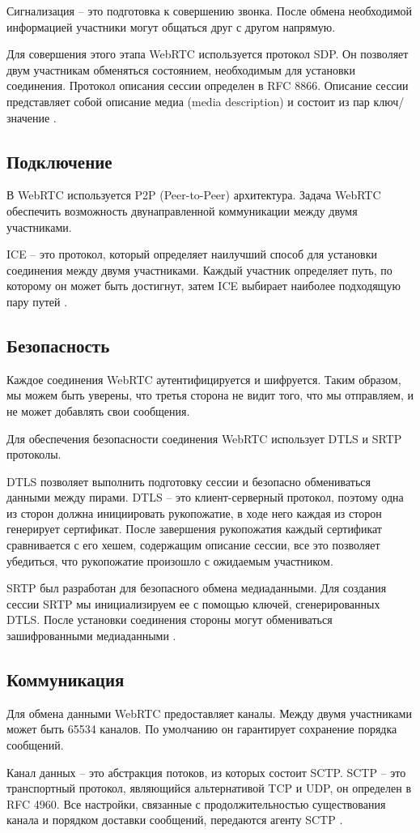 Сигнализация -- это подготовка к совершению звонка. После обмена необходимой информацией участники могут общаться друг с другом напрямую.

Для совершения этого этапа WebRTC используется протокол SDP. Он позволяет двум участникам обменяться состоянием, необходимым для установки соединения. Протокол описания сессии определен в RFC 8866. Описание сессии представляет собой описание медиа (media description) и состоит из пар ключ/значение \cite{v21}.

\subsection{Подключение}

В WebRTC используется P2P (Peer-to-Peer) архитектура. Задача WebRTC обеспечить возможность двунаправленной коммуникации между двумя участниками.

ICE -- это протокол, который определяет наилучший способ для установки соединения между двумя участниками. Каждый участник определяет путь, по которому он может быть достигнут, затем ICE выбирает наиболее подходящую пару путей \cite{v22}.

\subsection{Безопасность}

Каждое соединения WebRTC аутентифицируется и шифруется. Таким образом, мы можем быть уверены, что третья сторона не видит того, что мы отправляем, и не может добавлять свои сообщения.

Для обеспечения безопасности соединения WebRTC использует DTLS и SRTP протоколы.

DTLS позволяет выполнить подготовку сессии и безопасно обмениваться данными между пирами. DTLS -- это клиент-серверный протокол, поэтому одна из сторон должна инициировать рукопожатие, в ходе него каждая из сторон генерирует сертификат. После завершения рукопожатия каждый сертификат сравнивается с его хешем, содержащим описание сессии, все это позволяет убедиться, что рукопожатие произошло с ожидаемым участником.

SRTP был разработан для безопасного обмена медиаданными. Для создания сессии SRTP мы инициализируем ее с помощью ключей, сгенерированных DTLS. После установки соединения стороны могут обмениваться зашифрованными медиаданными \cite{v23}.

\subsection{Коммуникация}

Для обмена данными WebRTC предоставляет каналы. Между двумя участниками может быть 65534 каналов. По умолчанию он гарантирует сохранение порядка сообщений.

Канал данных -- это абстракция потоков, из которых состоит SCTP. SCTP -- это транспортный протокол, являющийся альтернативой TCP и UDP, он определен в RFC 4960. Все настройки, связанные с продолжительностью существования канала и порядком доставки сообщений, передаются агенту SCTP \cite{v24}.

\pagebreak